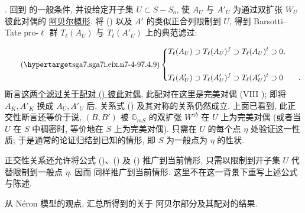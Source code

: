 \medskip
\noindent
{}. 回到  的一般条件, 并设给定开子集 $U\subset S-S_o$, 使 $A_U$ 与 $A'_U$ 为通过双扩张 $W_U$ 彼此对偶的 \underline{阿贝尔概形}. 将 () 以及 $A'$ 的类似正合列限制到 $U$, 得到 Barsotti--Tate pro-$\ell$ 群 $T_\ell(A_U)$ 与 $T_\ell(A'_U)$ 上的典范滤过:

\begin{equation}\tag{\SGARefTarget{sga7.sga7i.eix.n7-4-9}{7.4.9}}
\left\{
\begin{aligned}
T_\ell(A_U)&\supset T_\ell(A_U)^f\supset T_\ell(A_U)^t\supset0,\\[4ex]
T_\ell(A'_U)&\supset T_\ell(A'_U)^f\supset T_\ell(A'_U)^t\supset0
\qquad .
\end{aligned}
\right.
\end{equation}
断言\underline{这两个滤过关于配对 () 彼此对偶}, 此配对在这里是完美对偶 (VIII ); 即将 $A_K,A'_K$ 换成 $A_U,A'_U$ 后, 关系式 () 及其对称的关系仍然成立. 上面已看到, 此正交性断言还等价于说, $(B,B')$ 被 $\mathbb G_{mS}$ 的双扩张 $W^{ab}$ 在 $U$ 上为完美对偶 (或者当 $U$ 在 $S$ 中稠密时, 等价地在 $S$ 上为完美对偶). 只需在 $U$ 的每个点 $\eta$ 处验证这一性质; 于是通常的论证归结到已知的情形, 即 $S$ 为一般点为 $\eta$ 的性状.

正交性关系还允许将公式 ()、() 及 () 推广到当前情形, 只需以限制到开子集 $U$ 代替限制到一般点 $\eta$. 因而  同样推广到当前情形. 这里不在这一背景下重写上述公式与陈述.



从 N\'{e}ron 模型的观点, 汇总所得到的关于 阿贝尔部分及其配对的结果.

